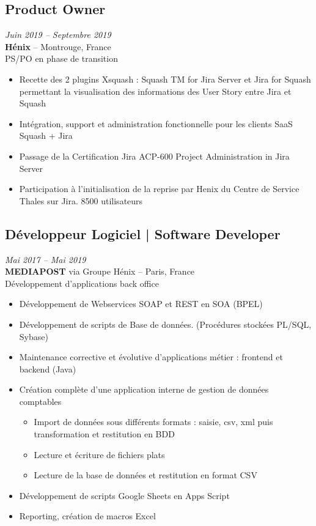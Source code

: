 \documentclass[11pt,a4paper]{article}
\begin{document}
\subsection*{Product Owner} \hfill \textit{Juin 2019 -- Septembre 2019}\\
\textbf{Hénix} -- Montrouge, France\\
PS/PO en phase de transition
\begin{itemize}
    \item Recette des 2 plugins Xsquash : Squash TM for Jira Server et Jira for Squash permettant la visualisation des informations des User Story entre Jira et Squash
    \item Intégration, support et administration fonctionnelle pour les clients SaaS Squash + Jira
    \item Passage de la Certification Jira ACP-600 Project Administration in Jira Server
    \item Participation à l'initialisation de la reprise par Henix du Centre de Service Thales sur Jira. 8500 utilisateurs
\end{itemize}

\subsection*{Développeur Logiciel | Software Developer} \hfill \textit{Mai 2017 -- Mai 2019}\\
\textbf{MEDIAPOST} via Groupe Hénix -- Paris, France\\
Développement d'applications back office
\begin{itemize}
    \item Développement de Webservices SOAP et REST en SOA (BPEL)
    \item Développement de scripts de Base de données. (Procédures stockées PL/SQL, Sybase)
    \item Maintenance corrective et évolutive d'applications métier : frontend et backend (Java)
    \item Création complète d'une application interne de gestion de données comptables
    \begin{itemize}
        \item Import de données sous différents formats : saisie, csv, xml puis transformation et restitution en BDD
        \item Lecture et écriture de fichiers plats
        \item Lecture de la base de données et restitution en format CSV
    \end{itemize}
    \item Développement de scripts Google Sheets en Apps Script
    \item Reporting, création de macros Excel
\end{itemize}
\end{document}
